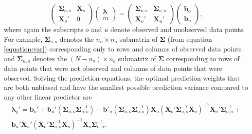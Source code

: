 \documentclass[]{interact}
\theoremstyle{plain}%
\theoremstyle{definition}
\theoremstyle{remark}
\begin{document}
\begin{equation}
\begin{pmatrix}
\bm{\Sigma}_{o, o} & \mathbf{X}_o \\
\mathbf{X}_o' & 0
\end{pmatrix} 
\begin{pmatrix}
\bm{\lambda} \\
m
\end{pmatrix} = 
\begin{pmatrix}
\bm{\Sigma}_{o, o} & \bm{\Sigma}_{o, u} \\
\mathbf{X}_{o}' & \mathbf{X}_{u}'
\end{pmatrix} 
\begin{pmatrix}
\mathbf{b}_{o} \\
\mathbf{b}_{u}
\end{pmatrix},
\end{equation} \noindent where again the subscripts \(o\) and \(u\)
denote observed and unobserved data points. For example,
\(\bm{\Sigma}_{o, o}\) denotes the \(n_o \times n_o\) submatrix of
\(\bm{\Sigma}\) (from equation \ref{equation:var}) corresponding only to
rows and columns of observed data points and \(\bm{\Sigma}_{u, o}\)
denotes the \((N - n_o) \times n_o\) submatrix of \(\bm{\Sigma}\)
corresponding to rows of data points that were not observed and columns
of data points that were observed. Solving the prediction equations, the
optimal prediction weights that are both unbiased and have the smallest
possible prediction variance compared to any other linear predictor are
\mbox{} \begin{multline}
\bm{\lambda}_o' = \mathbf{b}_{o}' + \mathbf{b}_{u}' (\bm{\Sigma}_{u, o}\bm{\Sigma}_{o, o}^{-1}) - \mathbf{b}'_{u}(\bm{\Sigma}_{u, o} \bm{\Sigma}_{o, o}^{-1})\mathbf{X}_o(\mathbf{X}_o'\bm{\Sigma}_{o, o}^{-1}\mathbf{X}_o)^{-1}\mathbf{X}_o'\bm{\Sigma}_{o, o}^{-1} + \\ \mathbf{b}_{u}' \mathbf{X}_{u}'(\mathbf{X}_o'\bm{\Sigma}_{o, o}^{-1}\mathbf{X}_o)^{-1}\mathbf{X}_o \bm{\Sigma}_{o, o}^{-1}.
\end{multline}
\end{document}
